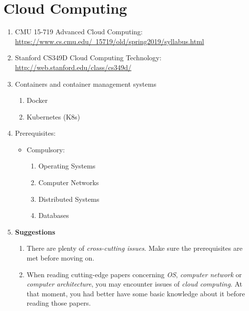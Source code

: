 \documentclass{article}
\begin{document}
\section{Cloud Computing}
\begin{enumerate}
    \item CMU 15-719 Advanced Cloud Computing:\\
    \href{https://www.cs.cmu.edu/~15719/old/spring2019/syllabus.html}{https://www.cs.cmu.edu/~15719/old/spring2019/syllabus.html}
    \item Stanford CS349D Cloud Computing Technology:\\
    \href{http://web.stanford.edu/class/cs349d/}{http://web.stanford.edu/class/cs349d/}
    \item Containers and container management systems
    \begin{enumerate}
        \item Docker
        \item Kubernetes (K8s)
    \end{enumerate}
    \item Prerequisites:
    \begin{itemize}
        \item Compulsory:
        \begin{enumerate}
            \item Operating Systems
            \item Computer Networks
            \item Distributed Systems
            \item Databases
        \end{enumerate}
    \end{itemize}
    \item \textbf{Suggestions}
    \begin{enumerate}
        \item There are plenty of \emph{cross-cutting issues}.
        Make sure the prerequisites are met before moving on.
        \item When reading cutting-edge papers concerning \emph{OS}, \emph{computer network} or \emph{computer architecture}, you may encounter issues of \emph{cloud computing}.
        At that moment, you had better have some basic knowledge about it before reading those papers.
    \end{enumerate}
\end{enumerate}
\end{document}
